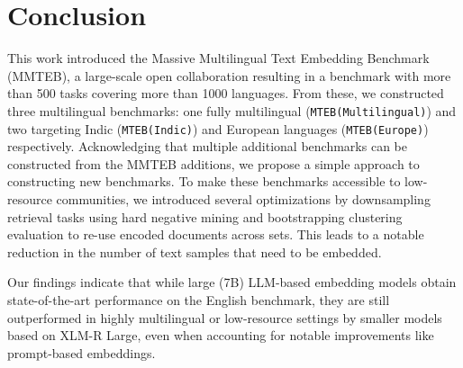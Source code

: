 \section{Conclusion}
This work introduced the Massive Multilingual Text Embedding Benchmark (MMTEB), a large-scale open collaboration resulting in a benchmark with more than 500 tasks covering more than 1000 languages. From these, we constructed three multilingual benchmarks: one fully multilingual (\texttt{MTEB(Multilingual)}) and two targeting Indic (\texttt{MTEB(Indic)}) and European languages (\texttt{MTEB(Europe)}) respectively. Acknowledging that multiple additional benchmarks can be constructed from the MMTEB additions, we propose a simple approach to constructing new benchmarks. To make these benchmarks accessible to low-resource communities, we introduced several optimizations by downsampling retrieval tasks using hard negative mining and bootstrapping clustering evaluation to re-use encoded documents across sets. This leads to a notable reduction in the number of text samples that need to be embedded.

Our findings indicate that while large (7B) LLM-based embedding models obtain state-of-the-art performance on the English benchmark, they are still outperformed in highly multilingual or low-resource settings by smaller models based on XLM-R Large, even when accounting for notable improvements like prompt-based embeddings.